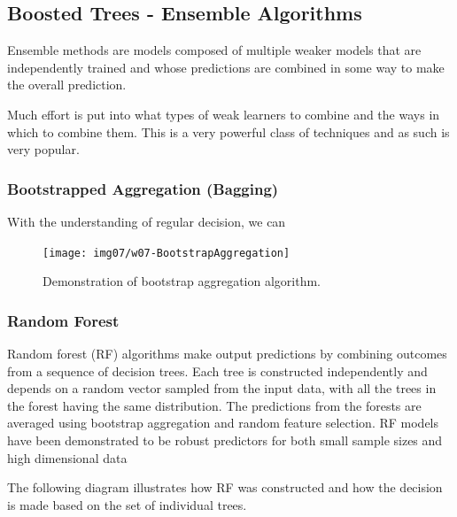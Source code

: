 \documentclass[
]{book}
\begin{document}
\hfill\break

\hypertarget{boosted-trees---ensemble-algorithms}{%
\subsection{Boosted Trees - Ensemble Algorithms}\label{boosted-trees---ensemble-algorithms}}

Ensemble methods are models composed of multiple weaker models that are independently trained and whose predictions are combined in some way to make the overall prediction.

Much effort is put into what types of weak learners to combine and the ways in which to combine them. This is a very powerful class of techniques and as such is very popular.

\hypertarget{bootstrapped-aggregation-bagging}{%
\subsubsection{Bootstrapped Aggregation (Bagging)}\label{bootstrapped-aggregation-bagging}}

With the understanding of regular decision, we can

\begin{figure}

{\centering \texttt{[image: img07/w07-BootstrapAggregation]} 

}

\caption{Demonstration of bootstrap aggregation algorithm.}\label{fig:unnamed-chunk-178}
\end{figure}

\hypertarget{random-forest}{%
\subsubsection{Random Forest}\label{random-forest}}

Random forest (RF) algorithms make output predictions by combining outcomes from a sequence of decision trees. Each tree is constructed independently and depends on a random vector sampled from the input data, with all the trees in the forest having the same distribution. The predictions from the forests are averaged using bootstrap aggregation and random feature selection. RF models have been demonstrated to be robust predictors for both small sample sizes and high dimensional data

The following diagram illustrates how RF was constructed and how the decision is made based on the set of individual trees.
\end{document}
